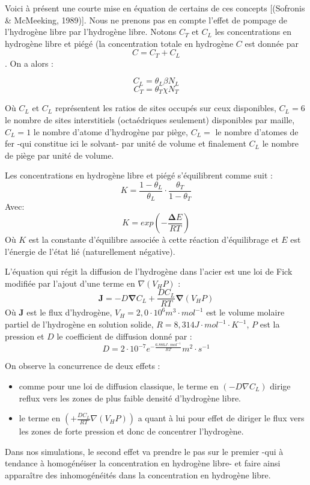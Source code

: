 \documentclass[a4paper, french, 11pt]{article}
\begin{document}
    Voici à présent une courte mise en équation de certains de ces concepts [(Sofronis \& McMeeking, 1989)]. 
    Nous ne prenons pas en compte l'effet de pompage de l'hydrogène libre par l'hydrogène libre.
    Notons \(C_{T}\) et \(C_{L}\) les concentrations en hydrogène libre et piégé (la concentration totale en hydrogène \(C\) est donnée par \[C = C_{T} + C_{L}\].
    On a alors : 

    \[C_{L} = \theta_{L} \beta N_{L}\]
    \[C_{T} = \theta_{T} \chi N_{T}\]

    Où \(C_{L}\) et \(C_{L}\) représentent les ratios de sites occupés sur ceux disponibles, \(C_{L} = 6\) le nombre de sites interstitiels (octaédriques seulement) disponibles par maille, \(C_{L} = 1\) le nombre d'atome d'hydrogène par piège, \(C_{L} = \) le nombre d'atomes de fer -qui constitue ici le solvant- par unité de volume et finalement \(C_{L}\) le nombre de piège par unité de volume.

    Les concentrations en hydrogène libre et piégé s'équilibrent comme suit : 
    \[K = \frac{1 - \theta_{L}}{\theta_{L}} \cdot \frac{\theta_{T}}{1-\theta_{T}}\]
    Avec:
    \[K = exp(-\frac{\boldsymbol{\Delta}E}{RT})\]
    Où  \(K\) est la constante d'équilibre associée à cette réaction d'équilibrage et \(E\) est l'énergie de l'état lié (naturellement négative). 

    
    L'équation qui régit la diffusion de l'hydrogène dans l'acier est une loi de Fick modifiée par l'ajout d'une terme en \(\nabla(V_{H}P)\) :
    \[\textbf{J}=-D\boldsymbol{\nabla}C_{L}+\frac{DC_{L}}{RT}\boldsymbol{\nabla}(V_{H}P)\]
    Où \(\textbf{J}\) est le flux d'hydrogène, \(V_{H} = 2,0 \cdot 10^{6} m^{3} \cdot mol^{-1}\) est le volume molaire partiel de l'hydrogène en solution solide, \(R = 8,314 J \cdot mol^{-1} \cdot K^{-1} \), \(P\) est la pression et \(D\) le coefficient de diffusion donné par : 
    \[D = 2 \cdot 10^{-7} e^{- 	\frac{6.88kJ \cdot mol^{-1} }{RT}	}m^{2} 		\cdot s^{-1} \]    

    On observe la concurrence de deux effets :
    \begin{itemize}
        \item comme pour une loi de diffusion classique, le terme en \((-D \nabla C_{L})\) dirige reflux vers les zones de plus faible densité d'hydrogène libre.
        \item le terme en \((+ \frac{D C_{L}}{RT} \nabla(V_{H}P))\) a quant à lui pour effet de diriger le flux vers les zones de forte pression et donc de concentrer l'hydrogène.
    \end{itemize}
    Dans nos simulations, le second effet va prendre le pas sur le premier -qui à tendance à homogénéiser la concentration en hydrogène libre- et faire ainsi apparaître des inhomogénéités dans la concentration en hydrogène libre.
\end{document}
